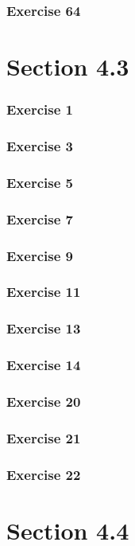 \documentclass{math}
\begin{document}
\subsubsection*{Exercise 64}

\section*{Section 4.3}

\subsubsection*{Exercise 1}
\subsubsection*{Exercise 3}
\subsubsection*{Exercise 5}
\subsubsection*{Exercise 7}
\subsubsection*{Exercise 9}
\subsubsection*{Exercise 11}
\subsubsection*{Exercise 13}
\subsubsection*{Exercise 14}
\subsubsection*{Exercise 20}
\subsubsection*{Exercise 21}
\subsubsection*{Exercise 22}

\section*{Section 4.4}
\end{document}
